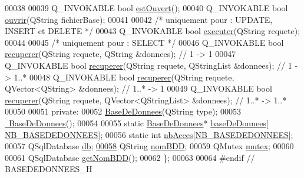 \begin{DoxyCode}
00038         
00039         Q\_INVOKABLE \textcolor{keywordtype}{bool} \hyperlink{class_base_de_donnees_af9ac332082ffd0dd35e412cefabe5e9c}{estOuvert}();
00040         Q\_INVOKABLE \textcolor{keywordtype}{bool} \hyperlink{class_base_de_donnees_a7f6a5510b08017b0d99115a84252f186}{ouvrir}(QString fichierBase);
00041 
00042         \textcolor{comment}{/* uniquement pour : UPDATE, INSERT et DELETE */}
00043         Q\_INVOKABLE \textcolor{keywordtype}{bool} \hyperlink{class_base_de_donnees_aa8de5f8f8bb17edc43f5c0ee33712081}{executer}(QString requete);
00044 
00045         \textcolor{comment}{/* uniquement pour : SELECT */}
00046         Q\_INVOKABLE \textcolor{keywordtype}{bool} \hyperlink{class_base_de_donnees_a77539baad389f5acf754cd2cd452403e}{recuperer}(QString requete, QString &donnees); \textcolor{comment}{// 1 -> 1}
00047         Q\_INVOKABLE \textcolor{keywordtype}{bool} \hyperlink{class_base_de_donnees_a77539baad389f5acf754cd2cd452403e}{recuperer}(QString requete, QStringList &donnees); \textcolor{comment}{// 1 -> 1..*}
00048         Q\_INVOKABLE \textcolor{keywordtype}{bool} \hyperlink{class_base_de_donnees_a77539baad389f5acf754cd2cd452403e}{recuperer}(QString requete, QVector<QString> &donnees); \textcolor{comment}{// 1..* -> 1}
00049         Q\_INVOKABLE \textcolor{keywordtype}{bool} \hyperlink{class_base_de_donnees_a77539baad389f5acf754cd2cd452403e}{recuperer}(QString requete, QVector<QStringList> &donnees); \textcolor{comment}{// 1..* ->
       1..*}
00050 
00051     \textcolor{keyword}{private}:
00052         \hyperlink{class_base_de_donnees_a10dd177f1008f675ab78c2221b2a6750}{BaseDeDonnees}(QString type);
00053         \hyperlink{class_base_de_donnees_a5dc474cdbe003644fb0ca7b8f2ec6b93}{~BaseDeDonnees}();
00054 
00055         \textcolor{keyword}{static} \hyperlink{class_base_de_donnees}{BaseDeDonnees}*  \hyperlink{class_base_de_donnees_a218c44b630523435e2f6f8f2f0c484f8}{baseDeDonnees}[
      \hyperlink{terminalmobile_2base_de_donnees_8h_a3760799f66ae5bcba760a4a6550d4206}{NB\_BASEDEDONNEES}];
00056         \textcolor{keyword}{static} \textcolor{keywordtype}{int}             \hyperlink{class_base_de_donnees_a5d2e5264c826c6600fd20a9831fd1782}{nbAcces}[\hyperlink{terminalmobile_2base_de_donnees_8h_a3760799f66ae5bcba760a4a6550d4206}{NB\_BASEDEDONNEES}];
00057         QSqlDatabase           \hyperlink{class_base_de_donnees_a3e738dcf443370c46a541677ab619f06}{db};
\hyperlink{class_base_de_donnees_a67c1d973c267a8f5fd6d7461550faa11}{00058}         QString                \hyperlink{class_base_de_donnees_a67c1d973c267a8f5fd6d7461550faa11}{nomBDD};
00059         QMutex                 \hyperlink{class_base_de_donnees_aa1b4696fac87a740f914aa73739086f2}{mutex};
00060 
00061         QSqlDatabase           \hyperlink{class_base_de_donnees_a467909531ae3cdebaf173f6e97cdc624}{getNomBDD}();
00062 \};
00063 
00064 \textcolor{preprocessor}{#endif // BASEDEDONNEES\_H}
\end{DoxyCode}
